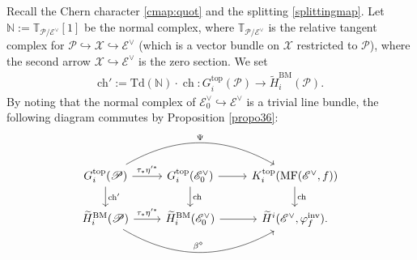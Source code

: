 \documentclass [11pt,oneside,a4paper,mathscr]{amsart}
\theoremstyle{definition}
\newcommand{\X}{\mathscr{X}}
\newcommand{\ch}{\operatorname{ch}}
\begin{document}
Recall the Chern character \eqref{cmap:quot} and the splitting \eqref{splittingmap}.
Let $\mathbb{N}:=\mathbb{T}_{\mathscr{P}/\mathscr{E}^{\vee}}[1]$ be the normal complex, where 
$\mathbb{T}_{\mathscr{P}/\mathscr{E}^{\vee}}$ is the relative tangent 
complex for $\mathscr{P}\hookrightarrow \X \hookrightarrow \mathscr{E}^\vee$ (which is a vector bundle on $\X$ restricted to $\mathscr{P}$), where the second arrow $\X\hookrightarrow \mathscr{E}^{\vee}$ is the zero section. 
We set 
\begin{align*}\mathrm{ch}':=\mathrm{Td}(\mathbb{N}) \cdot \ch \colon 
G_i^{\mathrm{top}}(\mathscr{P}) \to \widetilde{H}_i^{\mathrm{BM}}(\mathscr{P}).
\end{align*}
By noting that the normal complex of $\mathscr{E}_0^{\vee} \hookrightarrow \mathscr{E}^{\vee}$ is a trivial line bundle, 
the following diagram commutes by Proposition \ref{propo36}:
\begin{equation}\label{diagramsec5}
    \begin{tikzcd}
        G^{\mathrm{top}}_i(\mathscr{P})
        \arrow[rr, bend left, "\Psi"]
        \arrow[d, "\mathrm{ch}'"]\arrow[r, "\tau_{\ast}\eta'^{\ast}"]& G^{\mathrm{top}}_i(\mathscr{E}_0^{\vee})\arrow[d, "\mathrm{ch}"]\arrow[r]& K^{\mathrm{top}}_i(\mathrm{MF}(\mathscr{E}^\vee, f))\arrow[d, "\mathrm{ch}"]\\
        \widetilde{H}^{\mathrm{BM}}_i(\mathscr{P})\arrow[r, "\tau_*\eta'^*"]\arrow[rr, bend right, "\beta^\diamond"]& \widetilde{H}^{\mathrm{BM}}_i(\mathscr{E}^\vee_0)\arrow[r]& \widetilde{H}^i(\mathscr{E}^\vee, \varphi_f^{\mathrm{inv}}).
    \end{tikzcd}
\end{equation}
\end{document}
